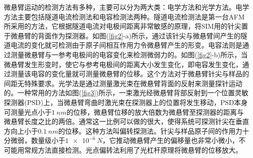 \documentclass[a4paper]{article}
\begin{document}
微悬臂运动的检测方法有多种，主要可以分为两大类：电学方法和光学方法。电学方法主要包括隧道电流检测法和电容检测法两种。隧道电流检测法是第一台AFM所采用的方法，它根据隧道电流对电极间距离非常敏感的原理，将SIM用的针尖置于微悬臂的背面作为探测器。如图(\ref{fig2}-a)所示，通过该针尖与微悬臂间产生的隧道电流的变化就可检测由于原子间相互作用力令微悬臂产生的形变。电容法则是通过测量微悬臂与一参考电极间的电容变化来检测微弱力的。如图(\ref{fig2}-b)所示，当微悬臂发生形变时，使它与参考电极间的距离大小发生变化，即电容发生变化，通过测量该电容的变化量就可测量微悬臂的位移。这个方法对于微悬臂针尖与样品的间距无特殊要求。光学法是通过测量激光束在微悬臂背面的反射来测量探针运动的。一种常用的方法如图(\ref{fig3})所示，一束激光经微悬臂背部反射到一个位置灵敏探测器(PSD)上，当微悬臂弯曲时激光束在探测器上的位置将发生移动，PSD本身可测量光点小于$ \SI{1}{nm} $的位移，微悬臂位移的放大倍数为微悬臂至探测器的距离与微悬臂长度之比的两倍。通常这一比例可以做的很大，使得系统可探测针尖在垂直方向上小于$ \SI{0.1}{nm} $的位移。这种方法叫偏转探测法。针尖与样品原子间的作用力十分微弱，数量级小于$ \SI{1e-6}{N} $，它推动微悬臂产生的偏移量也非常小微小，不可能用常规方法直接检测。光点偏转法利用了光杠杆原理将微悬臂的位移放大。
\end{document}
